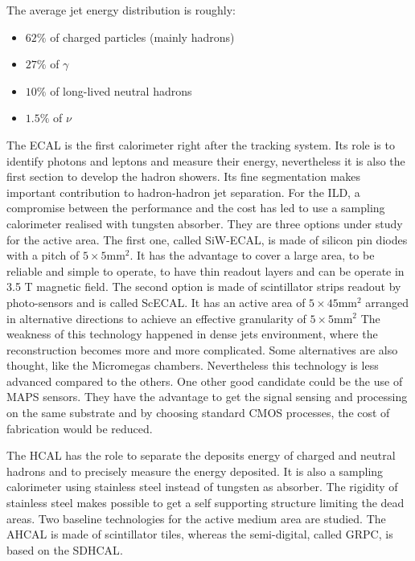       The average jet energy distribution is roughly: 
      \begin{itemize}
        \item $62 \%$ of charged particles (mainly hadrons)
        \item $27 \%$ of $\gamma$
        \item $10 \%$ of long-lived neutral hadrons
        \item $1.5 \%$ of $\nu$
      \end{itemize}

      The \gls{ECAL} is the first calorimeter right after the tracking system.
      Its role is to identify photons and leptons and measure their energy, nevertheless it is also the first section to develop the hadron showers.
      Its fine segmentation makes important contribution to hadron-hadron jet separation.
      For the \gls{ILD}, a compromise between the performance and the cost has led to use a sampling calorimeter realised with tungsten absorber.
      They are three options under study for the active area.
      The first one, called SiW-ECAL, is made of silicon pin diodes with a pitch of $5 \times 5 \text{mm}^2$. 
      It has the advantage to cover a large area, to be reliable and simple to operate, to have thin readout layers and can be operate in 3.5 T magnetic field.
      The second option is made of scintillator strips readout by photo-sensors and is called ScECAL.
      It has an active area of $5 \times 45 \text{mm}^2$ arranged in alternative directions to achieve an effective granularity of $5 \times 5 \text{mm}^2$ 
      The weakness of this technology happened in dense jets environment, where the reconstruction becomes more and more complicated.
      Some alternatives are also thought, like the Micromegas chambers. Nevertheless this technology is less advanced compared to the others.
      One other good candidate could be the use of \gls{MAPS} sensors.
      They have the advantage to get the signal sensing and processing on the same  substrate and by choosing standard CMOS processes, the cost of fabrication would be reduced.

      The  \gls{HCAL} has the role to separate the deposits energy of charged and neutral hadrons and to precisely measure the energy deposited.
      It is also a sampling calorimeter using stainless steel instead of tungsten as absorber. 
      The rigidity of stainless steel makes possible to get a self supporting structure limiting the dead areas.
      Two baseline technologies for the active medium area are studied.
      The  \gls{AHCAL} is made of scintillator tiles, whereas the semi-digital, called \gls{GRPC}, is based on the \gls{SDHCAL}.

